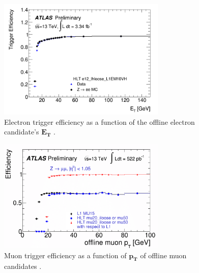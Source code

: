 \begin{figure}[h]
     \centering
        \captionsetup{width=0.7\textwidth}
        \includegraphics[width=8cm]{Appendices/Et_e12_lhloose_L1EM10VH}
        \caption{Electron trigger efficiency as a function of the offline electron candidate’s $\mathbf{E_T}$ \citep{eltrig}.}
        \label{fig:eltrig}
\end{figure}%
\begin{figure}[h]
     \centering
        \captionsetup{width=0.7\textwidth}
        \includegraphics[width=8cm]{Appendices/LHCC_HLT_mu20_iloose_L1MU15_OR_HLT_mu50_barrel_probe_pt_eff}
        \caption{Muon trigger efficiency as a function of $\mathbf{p_T}$ of offline muon candidates \citep{muontrig}.}  
        \label{fig:mutrig}   
\end{figure}